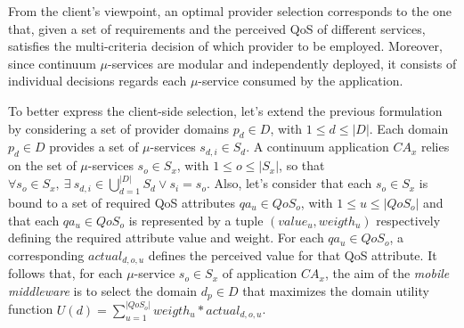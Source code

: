 

From the client's viewpoint, an optimal provider selection corresponds to the one that, given a set of requirements and the perceived QoS of different services, satisfies the multi-criteria decision of which provider to be employed. Moreover, since continuum $\mu$-services are modular and independently deployed, it consists of individual decisions regards each $\mu$-service consumed by the application.

To better express the client-side selection, let's extend the previous formulation by considering a set of provider domains $p_d \in D$, with $1 \le d \le |D|$. Each domain $p_d \in D$ provides a set of $\mu$-services $s_{d,i} \in S_d$. A continuum application $CA_x$ relies on the set of $\mu$-services $s_o \in S_x$, with $1 \le o \le |S_x|$, so that $\forall s_o \in S_x,\ \exists\ s_{d,i} \in \bigcup_{d=1}^{|D|} S_d \vee s_i = s_o$. Also, let's consider that each $s_o \in S_x$ is bound to a set of required QoS attributes $qa_u \in QoS_o$, with $1 \le u \le |QoS_o|$ and that each $qa_u \in QoS_o$ is represented by a tuple $(value_u, weigth_u)$ respectively defining the required attribute value and weight. For each $qa_u \in QoS_o$, a corresponding $actual_{d,o,u}$ defines the perceived value for that QoS attribute. It follows that, for each $\mu$-service $s_o \in S_x$ of application $CA_x$, the aim of the \textit{mobile middleware} is to select the domain $d_p \in D$ 
that maximizes the domain utility function $U(d) = \sum_{u=1}^{|QoS_o|} weigth_u * actual_{d,o,u}$.



